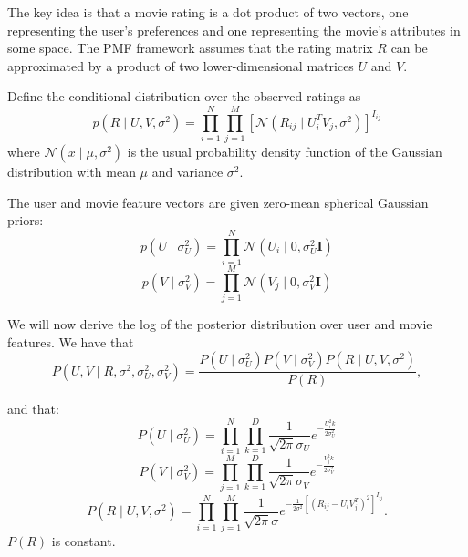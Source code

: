 \documentclass{article}
\begin{document}
The key idea is that a movie rating is a dot product of two vectors, one representing the user's preferences and one representing the movie's attributes in some space. The PMF framework assumes that the rating matrix $R$ can be approximated by a product of two lower-dimensional matrices $U$ and $V$.

Define the conditional distribution over the observed ratings as
\begin{equation}
    p(R \mid U,V, \sigma^2)= \prod_{i=1}^N \prod_{j=1}^M \left[ \mathcal{N}(R_{ij} \mid U_i^TV_j, \sigma^2) \right]^{I_{ij}}
\end{equation}
where $\mathcal{N}(x \mid \mu, \sigma^2)$ is the usual probability density function of the Gaussian distribution with mean $\mu$ and variance $\sigma^2$.

The user and movie feature vectors are given zero-mean spherical Gaussian priors:
\begin{equation}
    p(U \mid \sigma^2_U) = \prod_{i=1}^N\mathcal{N}(U_i \mid 0, \sigma_U^2 \textbf{I})
\end{equation}
\begin{equation}
    p(V \mid \sigma^2_V) = \prod_{j=1}^M\mathcal{N}(V_j \mid 0, \sigma_V^2 \textbf{I})
\end{equation}

We will now derive the log of the posterior distribution over user and movie features.
We have that
\begin{equation}
    P(U,V \mid R, \sigma^2, \sigma_U^2, \sigma_V^2) = \frac{P(U \mid \sigma_U^2)P(V \mid \sigma_V^2)P(R \mid U,V, \sigma^2)}{P(R)},
\end{equation}

and that:
\begin{equation}
    P(U \mid \sigma_U^2) = \prod_{i=1}^N \prod_{k=1}^D \frac{1}{\sqrt{2\pi} \sigma_U}e^{-\frac{U_i^2 k}{2 \sigma_U^2}}
\end{equation}
\begin{equation}
    P(V \mid \sigma_V^2) = \prod_{j=1}^M \prod_{k=1}^D \frac{1}{\sqrt{2\pi} \sigma_V}e^{-\frac{V_j^2 k}{2 \sigma_V^2}}
\end{equation}
\begin{equation}
    P(R \mid U,V, \sigma^2) = \prod_{i=1}^N \prod_{j=1}^M \frac{1}{\sqrt{2\pi}\sigma}e^{- \frac{1}{2 \sigma^2} [(R_{ij}-U_iV_j^T)^2]^{I_{ij}}}.
\end{equation}
$P(R)$ is constant.
\end{document}
